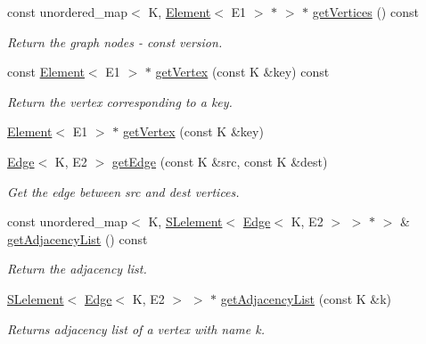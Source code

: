 \begin{DoxyCompactItemize}
const unordered\+\_\+map$<$ K, \hyperlink{classbridges_1_1datastructure_1_1_element}{Element}$<$ E1 $>$ $\ast$ $>$ $\ast$ \hyperlink{classbridges_1_1datastructure_1_1_graph_adj_list_a77b21cfdb87c4cf45ce29be6e7dd9791}{get\+Vertices} () const
\begin{DoxyCompactList}\small\item\em Return the graph nodes -\/ const version. \end{DoxyCompactList}\item 
const \hyperlink{classbridges_1_1datastructure_1_1_element}{Element}$<$ E1 $>$ $\ast$ \hyperlink{classbridges_1_1datastructure_1_1_graph_adj_list_ada58af550495cee2fe454c0be0f8504e}{get\+Vertex} (const K \&key) const
\begin{DoxyCompactList}\small\item\em Return the vertex corresponding to a key. \end{DoxyCompactList}\item 
\hyperlink{classbridges_1_1datastructure_1_1_element}{Element}$<$ E1 $>$ $\ast$ \hyperlink{classbridges_1_1datastructure_1_1_graph_adj_list_aa55482a035e233299d49874732113e6d}{get\+Vertex} (const K \&key)
\item 
\hyperlink{classbridges_1_1datastructure_1_1_edge}{Edge}$<$ K, E2 $>$ \hyperlink{classbridges_1_1datastructure_1_1_graph_adj_list_a2d8ff5a971516d05ff07bb1c3b73e405}{get\+Edge} (const K \&src, const K \&dest)
\begin{DoxyCompactList}\small\item\em Get the edge between src and dest vertices. \end{DoxyCompactList}\item 
const unordered\+\_\+map$<$ K, \hyperlink{classbridges_1_1datastructure_1_1_s_lelement}{S\+Lelement}$<$ \hyperlink{classbridges_1_1datastructure_1_1_edge}{Edge}$<$ K, E2 $>$ $>$ $\ast$ $>$ \& \hyperlink{classbridges_1_1datastructure_1_1_graph_adj_list_a23dad50371f073dd9a2f48e83720e86c}{get\+Adjacency\+List} () const
\begin{DoxyCompactList}\small\item\em Return the adjacency list. \end{DoxyCompactList}\item 
\hyperlink{classbridges_1_1datastructure_1_1_s_lelement}{S\+Lelement}$<$ \hyperlink{classbridges_1_1datastructure_1_1_edge}{Edge}$<$ K, E2 $>$ $>$ $\ast$ \hyperlink{classbridges_1_1datastructure_1_1_graph_adj_list_aa3df7d161ed7847a188b5818f78818d8}{get\+Adjacency\+List} (const K \&k)
\begin{DoxyCompactList}\small\item\em Returns adjacency list of a vertex with name k. \end{DoxyCompactList}\item 

\end{DoxyCompactItemize}
